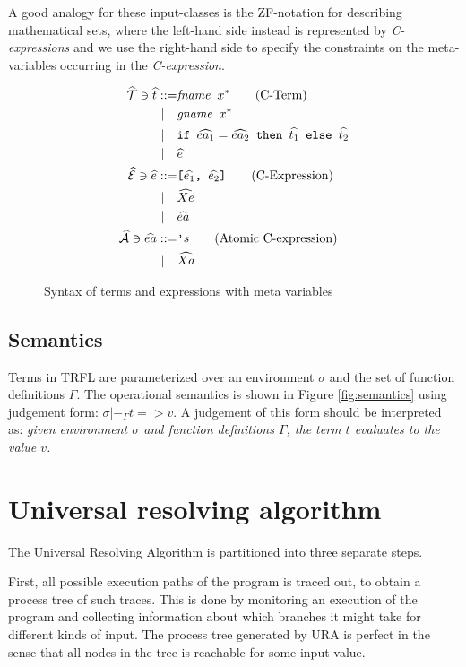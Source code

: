 \documentclass[10pt]{../sigplanconf}
\begin{document}
A good analogy for these input-classes is the ZF-notation for
describing mathematical sets, where the left-hand side instead is
represented by \textit{C-expressions} and we use the right-hand side
to specify the constraints on the meta-variables occurring in the
\textit{C-expression}.

\begin{figure}\centering
  \begin{align*}
    \widehat{\mathcal{T}} \ni \widehat{t}
      ::=& \texttt{\textit{\rmfamily fname} $x^{*}$} \tag{C-Term} \\
    | \quad & \texttt{\textit{\rmfamily gname} $x^{*}$} \\
    | \quad & \texttt{if $\widehat{ea_1} = \widehat{ea_2}$ then $\widehat{t_1}$ else $\widehat{t_2}$} \\
    | \quad & \widehat{e} \\
    \widehat{\mathcal{E}} \ni \widehat{e} ::=& \texttt{[$\widehat{e_1}$, $\widehat{e_2}$]} \tag{C-Expression} \\
    | \quad & \widehat{Xe} \\
    | \quad & \widehat{ea} \\
    \widehat{\mathcal{A}} \ni \widehat{ea} ::= & \texttt{'}s \tag{Atomic C-expression} \\
    | \quad & \widehat{Xa}
  \end{align*}

\caption{Syntax of terms and expressions with meta variables}
\label{fig:cbnf}
\end{figure}

\subsection{Semantics}
Terms in TRFL are parameterized over an environment $\sigma$ and
the set of function definitions $\Gamma$. The operational semantics is
shown in Figure \ref{fig:semantics} using judgement form: $\sigma
|-_\Gamma t => v$. A judgement of this form should be interpreted as:
\textit{given environment $\sigma$ and function definitions $\Gamma$,
  the term $t$ evaluates to the value $v$.}

\section{Universal resolving algorithm}
The Universal Resolving Algorithm is partitioned into three separate
steps.

First, all possible execution paths of the program is traced out, to
obtain a process tree of such traces. This is done by monitoring an
execution of the program and collecting information about which
branches it might take for different kinds of input. The process tree
generated by URA is perfect in the sense that all nodes in the tree is
reachable for some input value.
\end{document}
